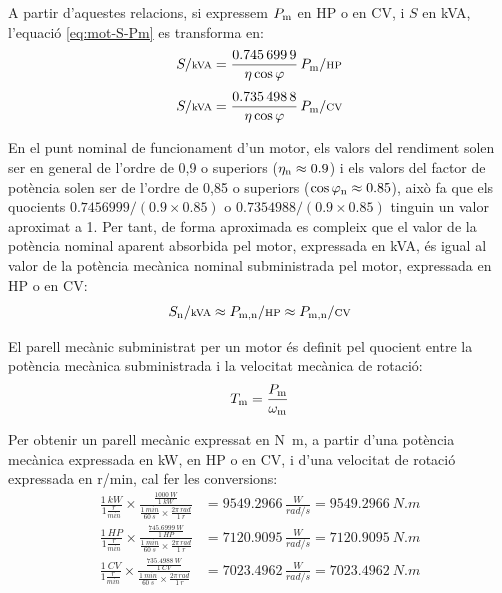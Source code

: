  A partir d'aquestes relacions, si expressem $P_\mathrm{m}$  en HP o en CV, i $S$  en kVA, l'equació \eqref{eq:mot-S-Pm} es transforma en:
\begin{align}
    S/{\scriptstyle\unit{kVA}} &= \frac{\num{0,7456999}}{\eta \cos\varphi}\,   P\ped{m}/{\scriptstyle\unit{HP}} \\[1ex]
    S/{\scriptstyle\unit{kVA}} &= \frac{\num{0,7354988}}{\eta \cos\varphi}\,   P\ped{m}/{\scriptstyle\unit{CV}}
\end{align}

En el punt nominal de funcionament d'un motor, els valors del rendiment solen ser en general de l'ordre de 0,9 o superiors ($\eta_\mathrm{n} \approx \num{0,9}$) i els valors del factor de potència solen ser de l'ordre de 0,85 o superiors ($\cos\varphi_\mathrm{n} \approx \num{0,85}$), això fa que els quocients $\num{0,7456999}/(\num{0,9} \times \num{0,85})$ o $\num{0,7354988}/(\num{0,9} \times \num{0,85})$ tinguin un valor aproximat a 1. Per tant, de forma aproximada es compleix que el valor de la potència nominal aparent absorbida pel motor, expressada en kVA, és igual al valor de la potència mecànica nominal subministrada pel motor, expressada en HP o en CV:
\begin{equation}\label{eq:kVA-CV-HP}
    S\ped{n}/{\scriptstyle \unit{kVA}} \approx  P\ped{m,n}/{\scriptstyle \unit{HP}} \approx  P\ped{m,n}/{\scriptstyle \unit{CV}}
\end{equation}


El parell mecànic subministrat per un motor és definit pel quocient entre la potència mecànica subministrada i la velocitat mecànica de rotació:
\begin{equation}\index{parell!mecànic}
    T\ped{m} = \frac{P\ped{m}}{\omega\ped{m}}\label{eq:T-P-w}
\end{equation}

Per  obtenir un  parell mecànic expressat en \unit{N.m}, a partir d'una potència mecànica expressada en kW, en HP o en CV, i d'una velocitat de rotació expressada en \unit{r/min}, cal  fer les conversions:
\begin{subequations}
\begin{align}
	\frac{\qty{1}{kW}}{1\frac{\unit{r}}{\unit{min}}} \times
    \frac{\frac{\qty{1000}{W}}{\qty{1}{kW}}}{ \frac{\qty{1}{min}}{\qty{60}{s}} \times \frac{2\pi\,\unit{rad}}{\qty{1}{r}}} &=  \num{9549,2966}\, \frac{\unit{W}}{\unit{rad/s}} = \qty{9549,2966}{N.m} \\[1ex]
    \frac{\qty{1}{HP}}{1\frac{\unit{r}}{\unit{min}}} \times
    \frac{\frac{\qty{745,6999}{W}}{\qty{1}{HP}}}{ \frac{\qty{1}{min}}{\qty{60}{s}} \times \frac{2\pi\,\unit{rad}}{\qty{1}{r}}} &=  \num{7120,9095}\, \frac{\unit{W}}{\unit{rad/s}} = \qty{7120,9095}{N.m} \\[1ex]
    \frac{\qty{1}{CV}}{1\frac{\unit{r}}{\unit{min}}} \times
    \frac{\frac{\qty{735,4988}{W}}{\qty{1}{CV}}}{ \frac{\qty{1}{min}}{\qty{60}{s}} \times \frac{2\pi\,\unit{rad}}{\qty{1}{r}}} &=  \num{7023,4962}\, \frac{\unit{W}}{\unit{rad/s}} = \qty{7023,4962}{N.m}
\end{align}
\end{subequations}

